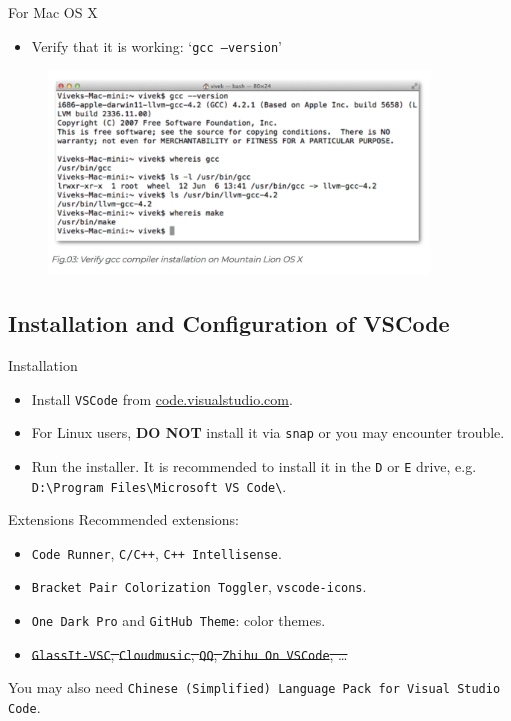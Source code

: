\documentclass[handout]{beamer}
\begin{document}
\begin{frame}{For Mac OS X}
    \begin{itemize}
        \item Verify that it is working: `\texttt{gcc --version}'
    \end{itemize}
    \begin{figure}[h]
        \centering
        \includegraphics[width=0.9\textwidth]{figures/mac_verify_gcc.png}
    \end{figure}
\end{frame}

\subsection{Installation and Configuration of VSCode}

\begin{frame}{Installation}
    \begin{itemize}
        \item Install \texttt{VSCode} from \url{code.visualstudio.com}.
        \item For Linux users, \textbf{DO NOT} install it via \texttt{snap} or you may encounter trouble.
        \pause
        \item Run the installer. It is recommended to install it in the \texttt{D} or \texttt{E} drive, e.g. \texttt{D:\textbackslash Program Files\textbackslash Microsoft VS Code\textbackslash}.
    \end{itemize}
\end{frame}

\begin{frame}{Extensions}
    Recommended extensions:
    \begin{itemize}
        \item \texttt{Code Runner}, \texttt{C/C++}, \texttt{C++ Intellisense}.
        \item \texttt{Bracket Pair Colorization Toggler}, \texttt{vscode-icons}.
        \item \texttt{One Dark Pro} and \texttt{GitHub Theme}: color themes.
        \item \sout{\texttt{GlassIt-VSC}, \texttt{Cloudmusic}, \texttt{QQ}, \texttt{Zhihu On VSCode}, \dots}
    \end{itemize}
    You may also need \texttt{Chinese (Simplified) Language Pack for Visual Studio Code}.
\end{frame}
\end{document}
